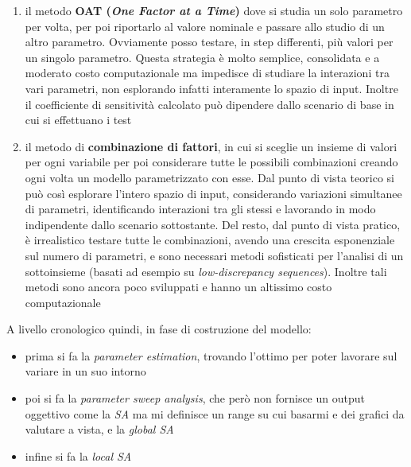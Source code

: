 \documentclass[a4paper,12pt, oneside]{book}
\begin{document}
\begin{enumerate}
  \item il metodo \textbf{OAT (\textit{One Factor at a Time})} dove si studia un
  solo parametro per volta, per poi riportarlo al valore nominale e passare
  allo studio di un altro parametro. Ovviamente posso testare, in step
  differenti, più valori per un singolo parametro. Questa strategia è molto
  semplice, consolidata e a moderato costo computazionale ma impedisce di
  studiare la interazioni tra vari parametri, non esplorando infatti interamente
  lo spazio di input. Inoltre il coefficiente di sensitività calcolato può 
  dipendere dallo scenario di base in cui si effettuano i test
  \item il metodo di \textbf{combinazione di fattori}, in cui si sceglie un
  insieme di valori per ogni variabile per poi considerare tutte le possibili
  combinazioni creando ogni volta un modello parametrizzato con esse. Dal punto
  di vista teorico si può così esplorare l'intero spazio di input, considerando
  variazioni simultanee di parametri, identificando interazioni tra gli stessi e
  lavorando in modo indipendente dallo scenario sottostante. Del resto, dal
  punto di vista pratico, è irrealistico testare tutte le combinazioni, avendo
  una crescita esponenziale sul numero di parametri, e sono
  necessari metodi sofisticati per l'analisi di un sottoinsieme (basati ad
  esempio su \textit{low-discrepancy sequences}). Inoltre tali metodi sono
  ancora poco sviluppati e hanno un altissimo costo computazionale
\end{enumerate}
A livello cronologico quindi, in fase di costruzione del modello:
\begin{itemize}
  \item prima si fa la \textit{parameter estimation}, trovando l'ottimo per
  poter lavorare sul variare in un suo intorno
  \item poi si fa la \textit{parameter sweep analysis}, che però non fornisce un
  output oggettivo come la \textit{SA} ma mi definisce un range su cui basarmi e
  dei grafici da valutare a vista,
  e la \textit{global SA} 
  \item infine si fa la \textit{local SA}
\end{itemize}
\end{document}
